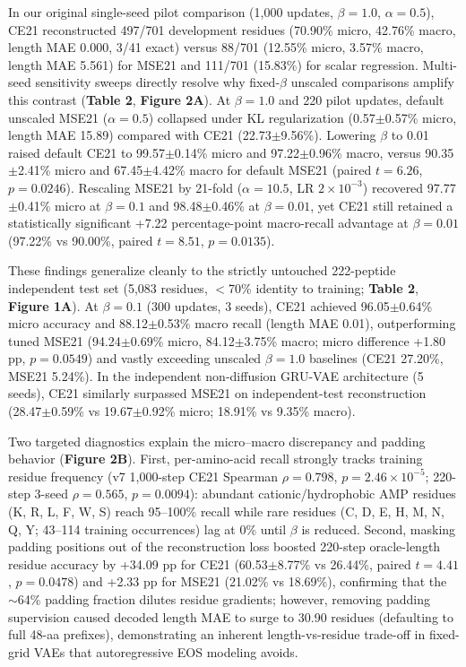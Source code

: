 \documentclass[unnumsec,webpdf,contemporary,large]{oup-authoring-template}
\newcommand{\rev}[1]{#1}
\begin{document}
\rev{In our original single-seed pilot comparison (1,000 updates, $\beta=1.0$, $\alpha=0.5$), CE21 reconstructed 497/701 development residues (70.90\% micro, 42.76\% macro, length MAE 0.000, 3/41 exact) versus 88/701 (12.55\% micro, 3.57\% macro, length MAE 5.561) for MSE21 and 111/701 (15.83\%) for scalar regression. Multi-seed sensitivity sweeps directly resolve why fixed-$\beta$ unscaled comparisons amplify this contrast (\textbf{Table 2}, \textbf{Figure 2A}). At $\beta=1.0$ and 220 pilot updates, default unscaled MSE21 ($\alpha=0.5$) collapsed under KL regularization (0.57$\pm$0.57\% micro, length MAE 15.89) compared with CE21 (22.73$\pm$9.56\%). Lowering $\beta$ to 0.01 raised default CE21 to 99.57$\pm$0.14\% micro and 97.22$\pm$0.96\% macro, versus 90.35$\pm$2.41\% micro and 67.45$\pm$4.42\% macro for default MSE21 (paired $t=6.26$, $p=0.0246$). Rescaling MSE21 by 21-fold ($\alpha=10.5$, LR $2\times 10^{-3}$) recovered 97.77$\pm$0.41\% micro at $\beta=0.1$ and 98.48$\pm$0.46\% at $\beta=0.01$, yet CE21 still retained a statistically significant +7.22 percentage-point macro-recall advantage at $\beta=0.01$ (97.22\% vs 90.00\%, paired $t=8.51$, $p=0.0135$).}

\rev{These findings generalize cleanly to the strictly untouched 222-peptide independent test set (5,083 residues, $<$70\% identity to training; \textbf{Table 2}, \textbf{Figure 1A}). At $\beta=0.1$ (300 updates, 3 seeds), CE21 achieved 96.05$\pm$0.64\% micro accuracy and 88.12$\pm$0.53\% macro recall (length MAE 0.01), outperforming tuned MSE21 (94.24$\pm$0.69\% micro, 84.12$\pm$3.75\% macro; micro difference +1.80 pp, $p=0.0549$) and vastly exceeding unscaled $\beta=1.0$ baselines (CE21 27.20\%, MSE21 5.24\%). In the independent non-diffusion GRU-VAE architecture (5 seeds), CE21 similarly surpassed MSE21 on independent-test reconstruction (28.47$\pm$0.59\% vs 19.67$\pm$0.92\% micro; 18.91\% vs 9.35\% macro).}

\rev{Two targeted diagnostics explain the micro--macro discrepancy and padding behavior (\textbf{Figure 2B}). First, per-amino-acid recall strongly tracks training residue frequency (v7 1,000-step CE21 Spearman $\rho=0.798$, $p=2.46\times 10^{-5}$; 220-step 3-seed $\rho=0.565$, $p=0.0094$): abundant cationic/hydrophobic AMP residues (K, R, L, F, W, S) reach 95--100\% recall while rare residues (C, D, E, H, M, N, Q, Y; 43--114 training occurrences) lag at 0\% until $\beta$ is reduced. Second, masking padding positions out of the reconstruction loss boosted 220-step oracle-length residue accuracy by +34.09 pp for CE21 (60.53$\pm$8.77\% vs 26.44\%, paired $t=4.41$, $p=0.0478$) and +2.33 pp for MSE21 (21.02\% vs 18.69\%), confirming that the $\sim$64\% padding fraction dilutes residue gradients; however, removing padding supervision caused decoded length MAE to surge to 30.90 residues (defaulting to full 48-aa prefixes), demonstrating an inherent length-vs-residue trade-off in fixed-grid VAEs that autoregressive EOS modeling avoids.}
\end{document}

